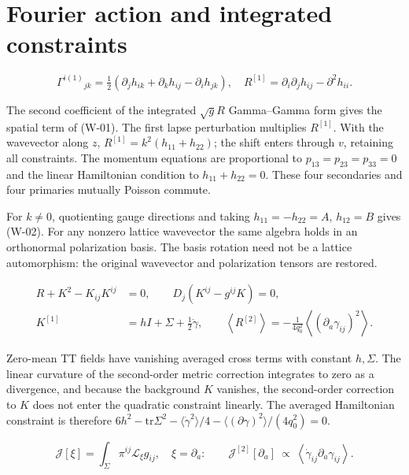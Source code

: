 \section{Fourier action and integrated constraints}

\begin{equation}\tag{WD-01}\label{eq:WD-01}
\Gamma^{i(1)}{}_{jk}=\tfrac12(\partial_jh_{ik}+\partial_kh_{ij}-\partial_ih_{jk}),\quad R^{[1]}=\partial_i\partial_jh_{ij}-\partial^2h_{ii}.
\end{equation}

The second coefficient of the integrated $\sqrt g R$ Gamma--Gamma form gives the spatial term of (W-01). The first lapse perturbation multiplies $R^{[1]}$. With the wavevector along $z$, $R^{[1]}=k^2(h_{11}+h_{22})$; the shift enters through $v$, retaining all constraints. The momentum equations are proportional to $p_{13}=p_{23}=p_{33}=0$ and the linear Hamiltonian condition to $h_{11}+h_{22}=0$. These four secondaries and four primaries mutually Poisson commute.

For $k\ne0$, quotienting gauge directions and taking $h_{11}=-h_{22}=A$, $h_{12}=B$ gives (W-02). For any nonzero lattice wavevector the same algebra holds in an orthonormal polarization basis. The basis rotation need not be a lattice automorphism: the original wavevector and polarization tensors are restored.

\begin{equation}\tag{WD-02}\label{eq:WD-02}
\begin{aligned}R+K^2-K_{ij}K^{ij}&=0,\qquad D_j(K^{ij}-g^{ij}K)=0,\\ K^{[1]}&=hI+\Sigma+\tfrac12\dot\gamma,\qquad\left\langle R^{[2]}\right\rangle=-\tfrac1{4q_0^2}\left\langle(\partial_a\gamma_{ij})^2\right\rangle.\end{aligned}
\end{equation}

Zero-mean TT fields have vanishing averaged cross terms with constant $h,\Sigma$. The linear curvature of the second-order metric correction integrates to zero as a divergence, and because the background $K$ vanishes, the second-order correction to $K$ does not enter the quadratic constraint linearly. The averaged Hamiltonian constraint is therefore $6h^2-\mathrm{tr}\Sigma^2-\langle\dot\gamma^2\rangle/4-\langle(\partial\gamma)^2\rangle/(4q_0^2)=0$.

\begin{equation}\tag{WD-03}\label{eq:WD-03}
\mathcal J[\xi]=\int_\Sigma\pi^{ij}\mathcal L_\xi g_{ij},\quad \xi=\partial_a:\qquad \mathcal J^{[2]}[\partial_a]\ \propto\ \left\langle\dot\gamma_{ij}\partial_a\gamma_{ij}\right\rangle.
\end{equation}


